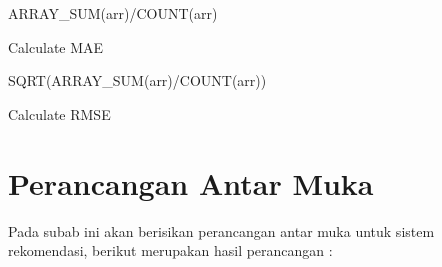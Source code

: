 \begin{algorithm}[H]
  \begin{algorithmic}[1]
       \State \Return ARRAY\_SUM(arr)/COUNT(arr)
    \EndProcedure
  \end{algorithmic} 
  \caption{Calculate MAE}
  \label{alg:calculateMAE}
\end{algorithm}

\begin{algorithm}[H]
  \begin{algorithmic}[1]
       \State \Return SQRT(ARRAY\_SUM(arr)/COUNT(arr))
    \EndProcedure
  \end{algorithmic} 
  \caption{Calculate RMSE}
  \label{alg:calculateRMSE}
\end{algorithm}

\section{Perancangan Antar Muka}
\label{sec:perancangan antar muka}

Pada subab ini akan berisikan perancangan antar muka untuk sistem rekomendasi, berikut merupakan hasil perancangan :


